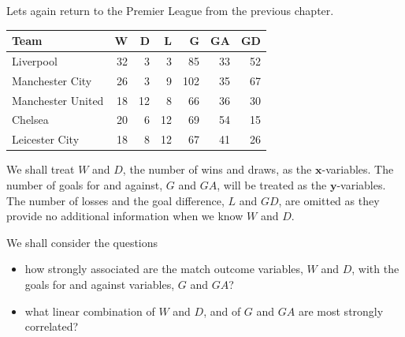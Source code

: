 \documentclass[]{book}
\newenvironment{Shaded}{\begin{snugshade}}{\end{snugshade}}
\newcommand{\CommentTok}[1]{\textcolor[rgb]{0.56,0.35,0.01}{\textit{#1}}}
\newcommand{\DataTypeTok}[1]{\textcolor[rgb]{0.13,0.29,0.53}{#1}}
\newcommand{\DecValTok}[1]{\textcolor[rgb]{0.00,0.00,0.81}{#1}}
\newcommand{\KeywordTok}[1]{\textcolor[rgb]{0.13,0.29,0.53}{\textbf{#1}}}
\newcommand{\NormalTok}[1]{#1}
\newcommand{\OperatorTok}[1]{\textcolor[rgb]{0.81,0.36,0.00}{\textbf{#1}}}
\newcommand{\OtherTok}[1]{\textcolor[rgb]{0.56,0.35,0.01}{#1}}
\newcommand{\StringTok}[1]{\textcolor[rgb]{0.31,0.60,0.02}{#1}}
\providecommand{\tightlist}{%
  \setlength{\itemsep}{0pt}\setlength{\parskip}{0pt}}
\theoremstyle{definition}
\theoremstyle{definition}
\theoremstyle{definition}
\theoremstyle{remark}
\begin{document}
Lets again return to the Premier League from the previous chapter.

\begin{Shaded}
\end{Shaded}

\begin{tabular}{lrrrrrr}
\toprule
Team & W & D & L & G & GA & GD\\
\midrule
Liverpool & 32 & 3 & 3 & 85 & 33 & 52\\
Manchester City & 26 & 3 & 9 & 102 & 35 & 67\\
Manchester United & 18 & 12 & 8 & 66 & 36 & 30\\
Chelsea & 20 & 6 & 12 & 69 & 54 & 15\\
Leicester City & 18 & 8 & 12 & 67 & 41 & 26\\
\bottomrule
\end{tabular}

We shall treat \(W\) and \(D\), the number of wins and draws, as the \(\mathbf x\)-variables. The number of goals for and against, \(G\) and \(GA\), will be treated as the \(\mathbf y\)-variables. The number of losses and the goal difference, \(L\) and \(GD\), are omitted as they provide no additional information when we know \(W\) and \(D\).

We shall consider the questions

\begin{itemize}
\tightlist
\item
  how strongly associated are the match outcome variables, \(W\) and \(D\), with the goals for and against variables, \(G\) and \(GA\)?
\item
  what linear combination of \(W\) and \(D\), and of \(G\) and \(GA\) are most strongly correlated?
\end{itemize}
\end{document}
